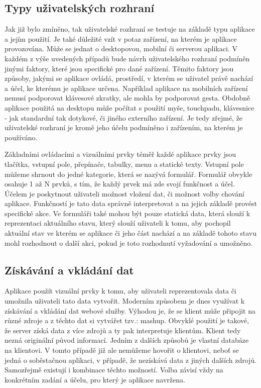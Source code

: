 \subsection{Typy uživatelských rozhraní}
Jak již bylo zmíněno, tak uživatelské rozhraní se testuje na základě typu aplikace a jejím použití. Je také důležité vzít v potaz zařízení, na kterém je aplikace provozována. Může se jednat o desktopovou, mobilní či serverou aplikaci. V každém z výše uvedených případů bude návrh uživatelského rozhraní podmíněn jinými faktory, které jsou specifické pro dané zařízení. Těmito faktory jsou způsoby, jakými se aplikace ovládá, prostředí, v kterém se uživatel právě nachází a účel, ke kterému je aplikace určena. Například aplikace na mobilních zařízení nemusí podporovat klávesové zkratky, ale mohla by podporovat gesta. Obdobně aplikace použitá na desktopu může počítat s použití myše, touchpadu, klávesnice - jak standardní tak dotykové, či jiného externího zařízení. Je tedy zřejmé, že uživatelské rozhraní je kromě jeho účelu podmíněno i zařízením, na kterém je používáno.

Základními ovládacími a vizuálními prvky téměř každé aplikace prvky jsou tlačítka, vstupní pole, přepínače, tabulky, menu a statické texty. Vstupní pole můžeme shrnout do jedné kategorie, která se nazývá formulář. Formulář obvykle osahuje 1 až N prvků, s tím, že každý prvek má zde svojí funkčnost a účel. Účelem je poskytnout uživateli možnost vložení dat, či možnost volby chování aplikace. Funkčností je tato data správně interpretovat a na jejich základě provést specifické akce. Ve formuláři také mohou být pouze statická data, která slouží k reprezentaci aktuálního stavu, který slouží uživateli k tomu, aby pochopil aktuální stav ve kterém se aplikace či jeho část nachází a na základě tohoto stavu mohl rozhodnout o další akci, pokud je toto rozhodnutí vyžadování a umožněno.
\subsection{Získávání a vkládání dat}
Aplikace použít vizuální prvky k tomu, aby uživateli reprezentovala data či umožnila uživateli tato data vytvořit. Moderním způsobem je dnes využívat k získávání a vkládání dat webové služby. Výhodou je, že se klient může připojit na různé zdroje a z těchto dat si vytvářet tzv.: mashup. Obvyklé použití je takové, že server získá data z více zdrojů a ty pak interpretuje klientům. Klient tedy nezná originální původ informací. Jedním z dalších způsobů je vlastní databáze na klientovi. V tomto případě již ale nemůžeme hovořit o klientovi, neboť se jedná o soběstačnou aplikaci, v případě, že nezískává data z jiných dalších zdrojů. Samozřejmě existují i kombinace těchto možností. Volba závisí vždy na konkrétním zadání a účelu, pro který je aplikace navržena.

